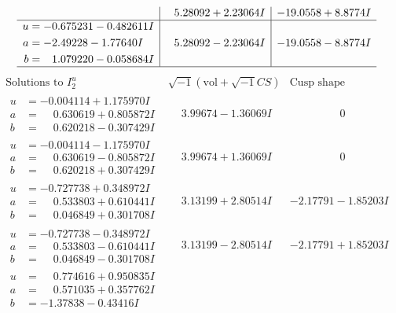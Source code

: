 \documentclass[1p]{elsarticle_modified}
\theoremstyle{definition}
\newcommand{\I}{\sqrt{-1}}
\begin{document}
$$\begin{array}{c|c|c}
 & \phantom{-}5.28092 + 2.23064 I & -19.0558 + 8.8774 I \\ \hline\begin{aligned}
u &= -0.675231 - 0.482611 I \\
a &= -2.49228 - 1.77640 I \\
b &= \phantom{-}1.079220 - 0.058684 I\end{aligned}
 & \phantom{-}5.28092 - 2.23064 I & -19.0558 - 8.8774 I\\
 \hline 
 \end{array}$$\newpage$$\begin{array}{c|c|c}  
\text{Solutions to }I^u_{2}& \I (\text{vol} + \sqrt{-1}CS) & \text{Cusp shape}\\
 \hline 
\begin{aligned}
u &= -0.004114 + 1.175970 I \\
a &= \phantom{-}0.630619 + 0.805872 I \\
b &= \phantom{-}0.620218 - 0.307429 I\end{aligned}
 & \phantom{-}3.99674 - 1.36069 I & \phantom{-0.000000 } 0 \\ \hline\begin{aligned}
u &= -0.004114 - 1.175970 I \\
a &= \phantom{-}0.630619 - 0.805872 I \\
b &= \phantom{-}0.620218 + 0.307429 I\end{aligned}
 & \phantom{-}3.99674 + 1.36069 I & \phantom{-0.000000 } 0 \\ \hline\begin{aligned}
u &= -0.727738 + 0.348972 I \\
a &= \phantom{-}0.533803 + 0.610441 I \\
b &= \phantom{-}0.046849 + 0.301708 I\end{aligned}
 & \phantom{-}3.13199 + 2.80514 I & -2.17791 - 1.85203 I \\ \hline\begin{aligned}
u &= -0.727738 - 0.348972 I \\
a &= \phantom{-}0.533803 - 0.610441 I \\
b &= \phantom{-}0.046849 - 0.301708 I\end{aligned}
 & \phantom{-}3.13199 - 2.80514 I & -2.17791 + 1.85203 I \\ \hline\begin{aligned}
u &= \phantom{-}0.774616 + 0.950835 I \\
a &= \phantom{-}0.571035 + 0.357762 I \\
b &= -1.37838 - 0.43416 I\end{aligned}

\end{array}$$
\end{document}
